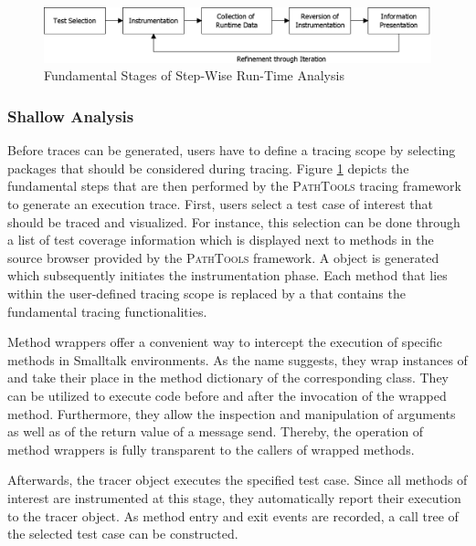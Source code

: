 \begin{figure}[tb]
	\centering
	\includegraphics[width=1.0\textwidth]{../images/02-TracingProcess}
	\caption{Fundamental Stages of Step-Wise Run-Time Analysis}
	\label{fig:BackgroundTracingApproach}
\end{figure}

\subsubsection{Shallow Analysis}
Before traces can be generated, users have to define a tracing scope by selecting  packages that should be considered during tracing.
Figure \ref{fig:BackgroundTracingApproach} depicts the fundamental steps that are then performed by the \textsc{PathTools} tracing framework to generate an execution trace.
First, users select a test case of interest that should be traced and visualized.
For instance, this selection can be done through a list of test coverage information which is displayed next to methods in the source browser provided by the \textsc{PathTools} framework.
A  object is generated which subsequently initiates the instrumentation phase.
Each method that lies within the user-defined tracing scope is replaced by a  that contains the fundamental tracing functionalities.

Method wrappers \cite{brant_wrappers_1998} offer a convenient way to intercept the execution of specific methods in Smalltalk environments.
As the name suggests, they wrap instances of  and take their place in the method dictionary of the corresponding class.
They can be utilized to execute code before and after the invocation of the wrapped method.
Furthermore, they allow the inspection and manipulation of arguments as well as of the return value of a message send.
Thereby, the operation of method wrappers is fully transparent to the callers of wrapped methods.

Afterwards, the tracer object executes the specified test case.
Since all methods of interest are instrumented at this stage, they automatically report their execution to the tracer object.
As method entry and exit events are recorded, a call tree of the selected test case can be constructed.

